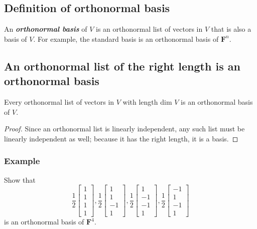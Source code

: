 \documentclass[11pt]{article}
\begin{document}
    \subsection{Definition of orthonormal basis}

    An \textbf{\emph{orthonormal basis}} of $V$ is an orthonormal list of vectors in $V$ that is also a basis of $V$. For example, the standard basis is an orthonormal basis of \(\textbf{F}^n\). 

    \subsection{An orthonormal list of the right length is an orthonormal basis}

    Every orthonormal list of vectors in $V$ with length dim $V$ is an orthonormal basis of $V$. 

    \begin{proof}
        Since an orthonormal list is linearly independent, any such list must be linearly independent as well; because it has the right length, it is a basis. 
    \end{proof}

    \subsubsection{Example}

    Show that \[\frac{1}{2} \begin{bmatrix}
        1 \\ 1 \\ 1 \\ 1
    \end{bmatrix}, \frac{1}{2}\begin{bmatrix}
        1 \\ 1 \\ -1 \\ 1
    \end{bmatrix}, \frac{1}{2} \begin{bmatrix}
        1 \\ -1 \\ -1 \\ 1
    \end{bmatrix}, \frac{1}{2} \begin{bmatrix}
        -1 \\ 1 \\ -1 \\ 1
    \end{bmatrix}\] is an orthonormal basis of \(\textbf{F}^4\).
\end{document}
